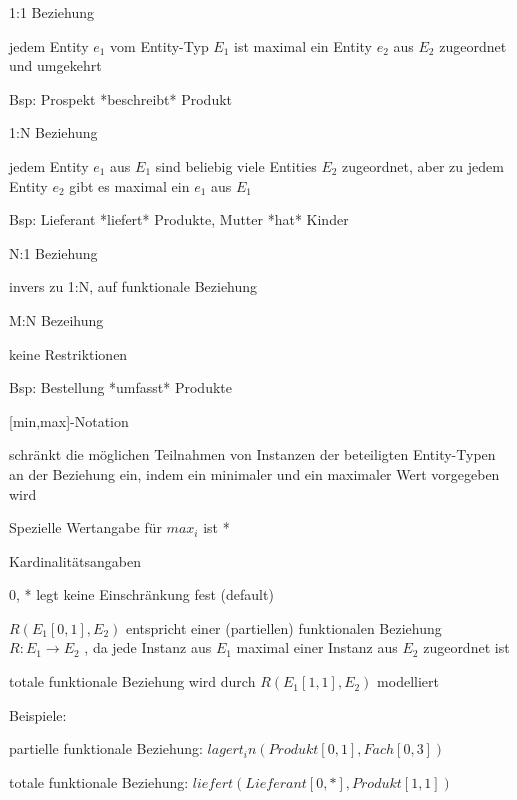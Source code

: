 \documentclass[a4paper]{article}
\begin{document}
\begin{multicols}{3}
\begin{itemize*}
    \item 1:1 Beziehung
    \begin{itemize*}
        \item jedem Entity $e_1$ vom Entity-Typ $E_1$ ist maximal ein Entity $e_2$ aus $E_2$ zugeordnet und umgekehrt
        \item Bsp: Prospekt *beschreibt* Produkt
    \end{itemize*}
    \item 1:N Beziehung
    \begin{itemize*}
        \item jedem Entity $e_1$ aus $E_1$ sind beliebig viele Entities $E_2$ zugeordnet, aber zu jedem Entity $e_2$ gibt es maximal ein $e_1$ aus $E_1$
        \item Bsp: Lieferant *liefert* Produkte, Mutter *hat* Kinder
    \end{itemize*}
    \item N:1 Beziehung
    \begin{itemize*}
        \item invers zu 1:N, auf funktionale Beziehung
    \end{itemize*}
    \item M:N Bezeihung
    \begin{itemize*}
        \item keine Restriktionen
        \item Bsp: Bestellung *umfasst* Produkte
    \end{itemize*}
\end{itemize*}

[min,max]-Notation
\begin{itemize*}
    \item schränkt die möglichen Teilnahmen von Instanzen der beteiligten Entity-Typen an der Beziehung ein, indem ein minimaler und ein maximaler Wert vorgegeben wird
    \item Spezielle Wertangabe für $max_i$ ist *
\end{itemize*}

Kardinalitätsangaben
\begin{itemize*}
    \item [0, *] legt keine Einschränkung fest (default)
    \item $R(E_1 [0, 1], E_2 )$ entspricht einer (partiellen) funktionalen Beziehung $R : E_1 \rightarrow E_2$ , da jede Instanz aus $E_1$ maximal einer Instanz aus $E_2$ zugeordnet ist
    \item totale funktionale Beziehung wird durch $R(E_1 [1, 1], E_2 )$ modelliert
    \item Beispiele:
    \begin{itemize*}
        \item partielle funktionale Beziehung: $lagert_in(Produkt[0,1],Fach[0,3])$
        \item totale funktionale Beziehung: $liefert(Lieferant[0,*],Produkt[1,1])$
    \end{itemize*}
\end{itemize*}


\end{multicols}
\end{document}
